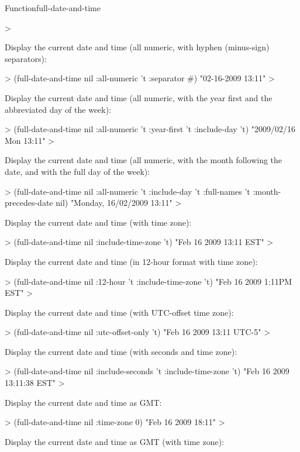 \documentclass[10pt,twoside,english,pdftex]{article}
\begin{document}
\begin{functiondoc}{Function}{full-date-and-time}
\begin{example}
  >
\end{example}
%
Display the current date and time (all numeric, with hyphen (minus-sign)
separators):
%
\W\supp\notpretop
\begin{example}
  > (full-date-and-time nil :all-numeric 't :separator #\-)
  "02-16-2009 13:11"
  >
\end{example}
%
Display the current date and time (all numeric, with the year first and the
abbreviated day of the week):
%
\W\supp\notpretop
\begin{example}
  > (full-date-and-time nil :all-numeric 't :year-first 't :include-day 't)
  "2009/02/16 Mon 13:11"
  >
\end{example}
%
Display the current date and time (all numeric, with the month following the
date, and with the full day of the week):
%
\W\supp\notpretop
\begin{example}
  > (full-date-and-time nil :all-numeric 't :include-day 't 
                            :full-names 't :month-precedes-date nil)
  "Monday, 16/02/2009 13:11"
  >
\end{example}
%
Display the current date and time (with time zone):
%
\W\supp\notpretop
\begin{example}
  > (full-date-and-time nil :include-time-zone 't)
  "Feb 16 2009 13:11 EST"
  >
\end{example}
%
Display the current date and time (in 12-hour format with time zone):
%
\W\supp\notpretop
\begin{example}
  > (full-date-and-time nil :12-hour 't :include-time-zone 't)
  "Feb 16 2009 1:11PM EST"
  >
\end{example}
%
Display the current date and time (with UTC-offset time zone):
%
\W\supp\notpretop
\begin{example}
  > (full-date-and-time nil :utc-offset-only 't)
  "Feb 16 2009 13:11 UTC-5"
  >
\end{example}
%
Display the current date and time (with seconds and time zone):
%
\W\supp\notpretop
\begin{example}
  > (full-date-and-time nil
      :include-seconds 't 
      :include-time-zone 't)
  "Feb 16 2009 13:11:38 EST"
  >
\end{example}
%
Display the current date and time as GMT: 
%
\W\supp\notpretop
\begin{example}
  > (full-date-and-time nil :time-zone 0)
  "Feb 16 2009 18:11"
  >
\end{example}
Display the current date and time as GMT (with time zone):
%
\W\supp\notpretop
\begin{example}

\end{example}
\end{functiondoc}
\end{document}
